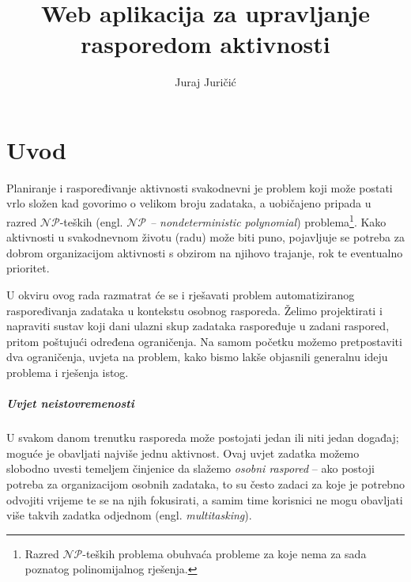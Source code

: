 \documentclass[times, utf8, zavrsni]{fer}
\begin{document}
\nocite{*}


\title{Web aplikacija za upravljanje rasporedom aktivnosti}

\author{Juraj Juričić}

\maketitle



\zahvala{}

\tableofcontents

\chapter{Uvod}\label{uvod}
Planiranje i raspoređivanje aktivnosti svakodnevni je problem koji može postati vrlo složen kad govorimo o velikom broju zadataka, a uobičajeno pripada u razred $\mathcal{NP}$-teških (engl. \textit{$\mathcal{NP}$ -- nondeterministic polynomial}) problema\footnote{Razred $\mathcal{NP}$-teških problema obuhvaća probleme za koje nema za sada poznatog polinomijalnog rješenja.}. Kako aktivnosti u svakodnevnom životu (radu) može biti puno, pojavljuje se potreba za dobrom organizacijom aktivnosti s obzirom na njihovo trajanje, rok te eventualno prioritet.

U okviru ovog rada razmatrat će se i rješavati problem automatiziranog raspoređivanja zadataka u kontekstu osobnog rasporeda. Želimo projektirati i napraviti sustav koji dani ulazni skup zadataka raspoređuje u zadani raspored, pritom poštujući određena ograničenja. Na samom početku možemo pretpostaviti dva ograničenja, uvjeta na problem, kako bismo lakše objasnili generalnu ideju problema i rješenja istog.

\paragraph{Uvjet neistovremenosti} U svakom danom trenutku rasporeda može postojati jedan ili niti jedan događaj; moguće je obavljati najviše jednu aktivnost. Ovaj uvjet zadatka možemo slobodno uvesti temeljem činjenice da slažemo \textit{osobni raspored} -- ako postoji potreba za organizacijom osobnih zadataka, to su često zadaci za koje je potrebno odvojiti vrijeme te se na njih fokusirati, a samim time korisnici ne mogu obavljati više takvih zadatka odjednom (engl. \textit{multitasking}).
\end{document}
